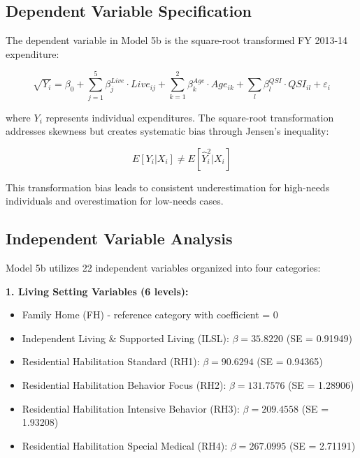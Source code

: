 \subsection{Dependent Variable Specification}

The dependent variable in Model 5b is the square-root transformed FY 2013-14 expenditure:

\begin{equation}
\sqrt{Y_i} = \beta_0 + \sum_{j=1}^{5} \beta_j^{Live} \cdot Live_{ij} + \sum_{k=1}^{2} \beta_k^{Age} \cdot Age_{ik} + \sum_{l} \beta_l^{QSI} \cdot QSI_{il} + \varepsilon_i
\end{equation}

where $Y_i$ represents individual expenditures. The square-root transformation addresses skewness but creates systematic bias through Jensen's inequality:

\begin{equation}
E[Y_i | X_i] \neq E[\hat{Y}_i^2 | X_i]
\end{equation}

This transformation bias leads to consistent underestimation for high-needs individuals and overestimation for low-needs cases.

\subsection{Independent Variable Analysis}

Model 5b utilizes 22 independent variables organized into four categories:

\textbf{1. Living Setting Variables (6 levels):}
\begin{itemize}
    \item Family Home (FH) - reference category with coefficient = 0
    \item Independent Living \& Supported Living (ILSL): $\beta = 35.8220$ (SE = 0.91949)
    \item Residential Habilitation Standard (RH1): $\beta = 90.6294$ (SE = 0.94365)
    \item Residential Habilitation Behavior Focus (RH2): $\beta = 131.7576$ (SE = 1.28906)
    \item Residential Habilitation Intensive Behavior (RH3): $\beta = 209.4558$ (SE = 1.93208)
    \item Residential Habilitation Special Medical (RH4): $\beta = 267.0995$ (SE = 2.71191)
\end{itemize}

